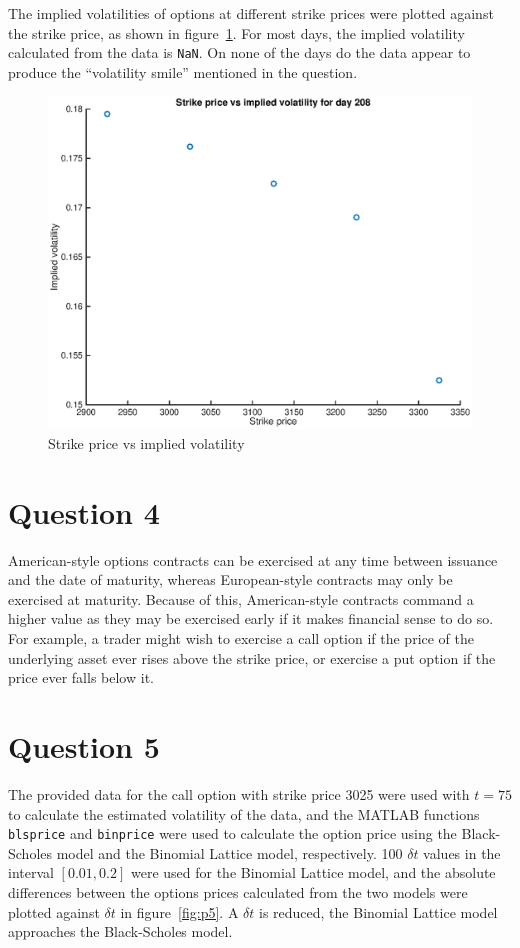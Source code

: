 \documentclass[12pt]{article}
\begin{document}
	The implied volatilities of options at different strike prices were plotted against the strike price, as shown in figure~\ref{fig:t208}. For most days, the implied volatility calculated from the data is \texttt{NaN}. On none of the days do the data appear to produce the ``volatility smile'' mentioned in the question.

	\begin{figure}
		\centering
		\includegraphics[width=0.5\linewidth]{figures/p3/t208.eps}
		\caption{Strike price vs implied volatility}
		\label{fig:t208}
	\end{figure}

	\section{Question 4}

	American-style options contracts can be exercised at any time between issuance and the date of maturity, whereas European-style contracts may only be exercised at maturity. Because of this, American-style contracts command a higher value as they may be exercised early if it makes financial sense to do so. For example, a trader might wish to exercise a call option if the price of the underlying asset ever rises above the strike price, or exercise a put option if the price ever falls below it.

	\section{Question 5}

	The provided data for the call option with strike price 3025 were used with $t = 75$ to calculate the estimated volatility of the data, and the MATLAB functions \texttt{blsprice} and \texttt{binprice} were used to calculate the option price using the Black-Scholes model and the Binomial Lattice model, respectively. 100 $\delta t$ values in the interval $[0.01, 0.2]$ were used for the Binomial Lattice model, and the absolute differences between the options prices calculated from the two models were plotted against $\delta t$ in figure~\ref{fig:p5}. A $\delta t$ is reduced, the Binomial Lattice model approaches the Black-Scholes model.
\end{document}
